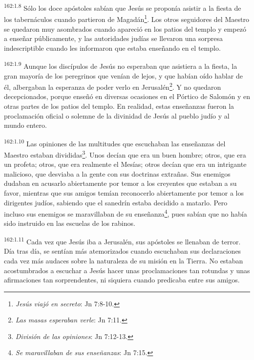 \par
\textsuperscript{162:1.8} Sólo los doce apóstoles sabían que Jesús se proponía asistir a la fiesta de los tabernáculos cuando partieron de Magadán\footnote{\textit{Jesús viajó en secreto}: Jn 7:8-10.}. Los otros seguidores del Maestro se quedaron muy asombrados cuando apareció en los patios del templo y empezó a enseñar públicamente, y las autoridades judías se llevaron una sorpresa indescriptible cuando les informaron que estaba enseñando en el templo.

\par
\textsuperscript{162:1.9} Aunque los discípulos de Jesús no esperaban que asistiera a la fiesta, la gran mayoría de los peregrinos que venían de lejos, y que habían oído hablar de él, albergaban la esperanza de poder verlo en Jerusalén\footnote{\textit{Las masas esperaban verle}: Jn 7:11.}. Y no quedaron decepcionados, porque enseñó en diversas ocasiones en el Pórtico de Salomón y en otras partes de los patios del templo. En realidad, estas enseñanzas fueron la proclamación oficial o solemne de la divinidad de Jesús al pueblo judío y al mundo entero.

\par
\textsuperscript{162:1.10} Las opiniones de las multitudes que escuchaban las enseñanzas del Maestro estaban divididas\footnote{\textit{División de las opiniones}: Jn 7:12-13.}. Unos decían que era un buen hombre; otros, que era un profeta; otros, que era realmente el Mesías; otros decían que era un intrigante malicioso, que desviaba a la gente con sus doctrinas extrañas. Sus enemigos dudaban en acusarlo abiertamente por temor a los creyentes que estaban a su favor, mientras que sus amigos temían reconocerlo abiertamente por temor a los dirigentes judíos, sabiendo que el sanedrín estaba decidido a matarlo. Pero incluso sus enemigos se maravillaban de su enseñanza\footnote{\textit{Se maravillaban de sus enseñanzas}: Jn 7:15.}, pues sabían que no había sido instruido en las escuelas de los rabinos.

\par
\textsuperscript{162:1.11} Cada vez que Jesús iba a Jerusalén, sus apóstoles se llenaban de terror. Día tras día, se sentían más atemorizados cuando escuchaban sus declaraciones cada vez más audaces sobre la naturaleza de su misión en la Tierra. No estaban acostumbrados a escuchar a Jesús hacer unas proclamaciones tan rotundas y unas afirmaciones tan sorprendentes, ni siquiera cuando predicaba entre sus amigos.

